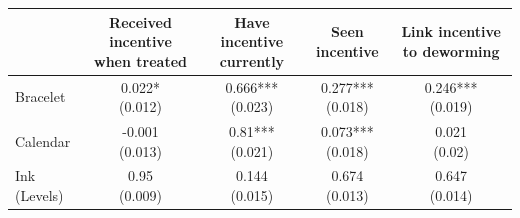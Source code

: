 


\centering
\begin{tabular}[t]{lcccc}
\toprule
 & Received incentive when treated & Have incentive currently & Seen incentive & Link incentive to deworming\\
\midrule
Bracelet & \makecell[c]{0.022*\\(0.012)} & \makecell[c]{0.666***\\(0.023)} & \makecell[c]{0.277***\\(0.018)} & \makecell[c]{0.246***\\(0.019)}\\
Calendar & \makecell[c]{-0.001\\(0.013)} & \makecell[c]{0.81***\\(0.021)} & \makecell[c]{0.073***\\(0.018)} & \makecell[c]{0.021\\(0.02)}\\
Ink (Levels) & \makecell[c]{0.95\\(0.009)} & \makecell[c]{0.144\\(0.015)} & \makecell[c]{0.674\\(0.013)} & \makecell[c]{0.647\\(0.014)}\\
\bottomrule
\end{tabular}

